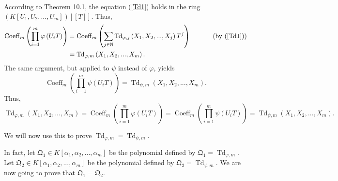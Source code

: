\documentclass[numbers=enddot,12pt,final,onecolumn,notitlepage]{scrartcl}%
\begin{document}
According to Theorem 10.1, the equation (\ref{Td1}) holds in the ring $\left(
K\left[  U_{1},U_{2},...,U_{m}\right]  \right)  \left[  \left[  T\right]
\right]  $. Thus,%
\begin{align*}
\operatorname*{Coeff}\nolimits_{m}\left(  \prod\limits_{i=1}^{m}\varphi\left(
U_{i}T\right)  \right)   &  =\operatorname*{Coeff}\nolimits_{m}\left(
\sum_{j\in\mathbb{N}}\operatorname*{Td}\nolimits_{\varphi,j}\left(
X_{1},X_{2},...,X_{j}\right)  T^{j}\right)  \ \ \ \ \ \ \ \ \ \ \left(
\text{by (\ref{Td1})}\right) \\
&  =\operatorname*{Td}\nolimits_{\varphi,m}\left(  X_{1},X_{2},...,X_{m}%
\right)  .
\end{align*}
The same argument, but applied to $\psi$ instead of $\varphi$, yields%
\[
\operatorname*{Coeff}\nolimits_{m}\left(  \prod\limits_{i=1}^{m}\psi\left(
U_{i}T\right)  \right)  =\operatorname*{Td}\nolimits_{\psi,m}\left(
X_{1},X_{2},...,X_{m}\right)  .
\]
Thus,%
\[
\operatorname*{Td}\nolimits_{\varphi,m}\left(  X_{1},X_{2},...,X_{m}\right)
=\operatorname*{Coeff}\nolimits_{m}\left(  \prod\limits_{i=1}^{m}%
\varphi\left(  U_{i}T\right)  \right)  =\operatorname*{Coeff}\nolimits_{m}%
\left(  \prod\limits_{i=1}^{m}\psi\left(  U_{i}T\right)  \right)
=\operatorname*{Td}\nolimits_{\psi,m}\left(  X_{1},X_{2},...,X_{m}\right)  .
\]


We will now use this to prove $\operatorname*{Td}\nolimits_{\varphi
,m}=\operatorname*{Td}\nolimits_{\psi,m}$.

In fact, let $\mathfrak{Q}_{1}\in K\left[  \alpha_{1},\alpha_{2}%
,...,\alpha_{m}\right]  $ be the polynomial defined by $\mathfrak{Q}%
_{1}=\operatorname*{Td}\nolimits_{\varphi,m}$. Let $\mathfrak{Q}_{2}\in
K\left[  \alpha_{1},\alpha_{2},...,\alpha_{m}\right]  $ be the polynomial
defined by $\mathfrak{Q}_{2}=\operatorname*{Td}\nolimits_{\psi,m}$. We are now
going to prove that $\mathfrak{Q}_{1}=\mathfrak{Q}_{2}$.
\end{document}
